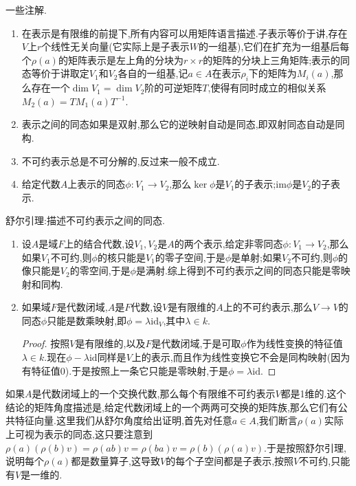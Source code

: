 一些注解.
\begin{enumerate}
	\item 在表示是有限维的前提下,所有内容可以用矩阵语言描述.子表示等价于讲,存在$V$上$r$个线性无关向量(它实际上是子表示$W$的一组基),它们在扩充为一组基后每个$\rho(a)$的矩阵表示是左上角的分块为$r\times r$的矩阵的分块上三角矩阵;表示的同态等价于讲取定$V_1$和$V_2$各自的一组基,记$a\in A$在表示$\rho_i$下的矩阵为$M_i(a)$,那么存在一个$\dim V_1=\dim V_2$阶的可逆矩阵$T$,使得有同时成立的相似关系$M_2(a)=TM_1(a)T^{-1}$.
	\item 表示之间的同态如果是双射,那么它的逆映射自动是同态,即双射同态自动是同构.
	\item 不可约表示总是不可分解的,反过来一般不成立.
	\item 给定代数$A$上表示的同态$\phi:V_1\to V_2$,那么$\ker\phi$是$V_1$的子表示;$\mathrm{im}\phi$是$V_2$的子表示.
\end{enumerate}

舒尔引理:描述不可约表示之间的同态.
\begin{enumerate}
	\item 设$A$是域$F$上的结合代数,设$V_1,V_2$是$A$的两个表示,给定非零同态$\phi:V_1\to V_2$,那么如果$V_1$不可约,则$\phi$的核只能是$V_1$的零子空间,于是$\phi$是单射;如果$V_2$不可约,则$\phi$的像只能是$V_2$的零空间,于是$\phi$是满射.综上得到不可约表示之间的同态只能是零映射和同构.
	\item 如果域$F$是代数闭域,$A$是$F$代数,设$V$是有限维的$A$上的不可约表示,那么$V\to V$的同态$\phi$只能是数乘映射,即$\phi=\lambda\mathrm{id}_V$,其中$\lambda\in k$.
	\begin{proof}
		
		按照$V$是有限维的,以及$F$是代数闭域,于是可取$\phi$作为线性变换的特征值$\lambda\in k$.现在$\phi-\lambda\mathrm{id}$同样是$V$上的表示,而且作为线性变换它不会是同构映射(因为有特征值0).于是按照上一条它只能是零映射,于是$\phi=\lambda\mathrm{id}$.
	\end{proof}
\end{enumerate}

如果$A$是代数闭域上的一个交换代数,那么每个有限维不可约表示$V$都是1维的.这个结论的矩阵角度描述是,给定代数闭域上的一个两两可交换的矩阵族,那么它们有公共特征向量.这里我们从舒尔角度给出证明,首先对任意$a\in A$,我们断言$\rho(a)$实际上可视为表示的同态,这只要注意到$\rho(a)(\rho(b)v)=\rho(ab)v=\rho(ba)v=\rho(b)(\rho(a)v)$.于是按照舒尔引理,说明每个$\rho(a)$都是数量算子,这导致$V$的每个子空间都是子表示,按照$V$不可约,只能有$V$是一维的.

